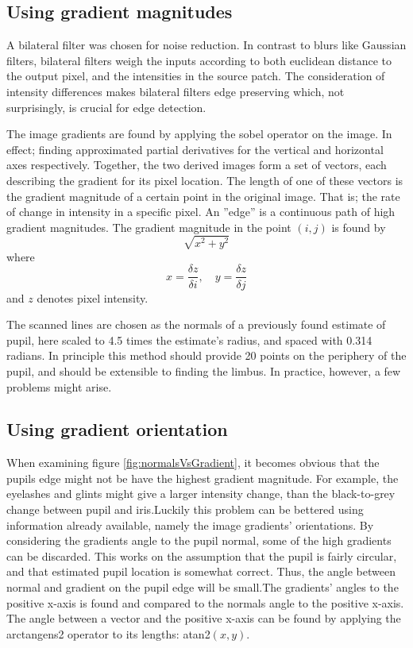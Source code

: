 \subsection{Using gradient magnitudes}
A bilateral filter was chosen for noise reduction. In contrast to blurs like
Gaussian filters, bilateral filters weigh the inputs according to both
euclidean distance to the output pixel, and the intensities in the source
patch. The consideration of intensity differences makes bilateral filters edge
preserving which, not surprisingly, is crucial for edge detection.

The image gradients are found by applying the sobel operator on the image. In
effect; finding approximated partial derivatives for the vertical and
horizontal axes respectively. Together, the two derived images form a set of
vectors, each describing the gradient for its pixel location. The length of one
of these vectors is the gradient magnitude of a certain point in the original
image. That is; the rate of change in intensity in a specific pixel. An
''edge'' is a continuous path of high gradient magnitudes. The gradient
magnitude in the point $(i,j)$ is found by $$\sqrt{x^2+y^2}$$ where $$x =
\frac{\delta z}{\delta i}, \quad y = \frac{\delta z}{\delta j}$$ and $z$
denotes pixel intensity. 

The scanned lines are chosen as the normals of a
previously found estimate of pupil, here scaled to 4.5 times the estimate’s
radius, and spaced with 0.314 radians. In principle this method should provide
20 points on the periphery of the pupil, and should be extensible to finding
the limbus. In practice, however, a few problems might arise.

\subsection{Using gradient orientation}
When examining figure \ref{fig:normalsVsGradient}, it becomes obvious that the
pupils edge might not be have the highest gradient magnitude. For example, the
eyelashes and glints might give a larger intensity change, than the
black-to-grey change between pupil and iris.Luckily this problem can be
bettered using information already available, namely the image gradients’
orientations. By considering the gradients angle to the pupil normal, some of
the high gradients can be discarded. This works on the assumption that the
pupil is fairly circular, and that estimated pupil location is somewhat
correct. Thus, the angle between normal and gradient on the pupil edge will be
small.The gradients’ angles to the positive x-axis is found and compared to the
normals angle to the positive x-axis. The angle between a vector and the
positive x-axis can be found by applying the arctangens2 operator to its
lengths: atan2$(x,y)$.

